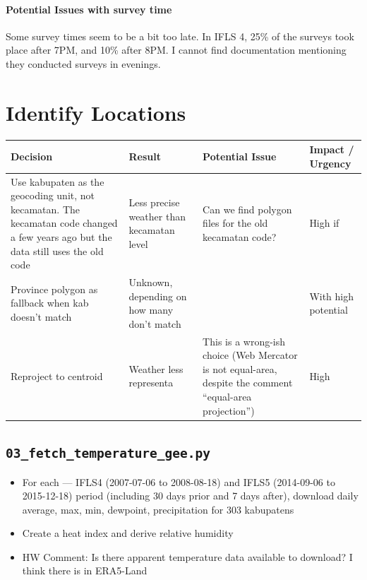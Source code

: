\documentclass[11pt]{article}
\begin{document}
\paragraph{Potential Issues with survey time} Some survey times seem to be a bit too late. In IFLS 4, 25\% of the surveys took place after 7PM, and 10\% after 8PM. I cannot find documentation mentioning they conducted surveys in evenings.






\section{Identify Locations}


\begin{table}[h]
\centering
\begin{tabularx}{\textwidth}{L{3cm} L{2.5cm} X L{2cm}}
\toprule
\textbf{Decision} & \textbf{Result} & \textbf{Potential Issue} & \textbf{Impact / Urgency} \\
\midrule
Use kabupaten as the geocoding unit, not kecamatan. The kecamatan code changed a few years ago but the data still uses the old code & Less precise weather than kecamatan level & Can we find polygon files for the old kecamatan code? & High if \\
\addlinespace
Province polygon as fallback when kab doesn't match & Unknown, depending on how many don't match & & With high potential \\
\addlinespace
Reproject to centroid & Weather less representa & This is a wrong-ish choice (Web Mercator is not equal-area, despite the comment ``equal-area projection'') & High \\
\bottomrule
\end{tabularx}
\end{table}

\subsection*{\texttt{03\_fetch\_temperature\_gee.py}}
\begin{itemize}[leftmargin=*]
  \item For each --- IFLS4 (2007-07-06 to 2008-08-18) and IFLS5 (2014-09-06 to 2015-12-18) period (including 30 days prior and 7 days after), download daily average, max, min, dewpoint, precipitation for 303 kabupatens
  \item Create a heat index and derive relative humidity
  \item HW Comment: Is there apparent temperature data available to download? I think there is in ERA5-Land
\end{itemize}
\end{document}
